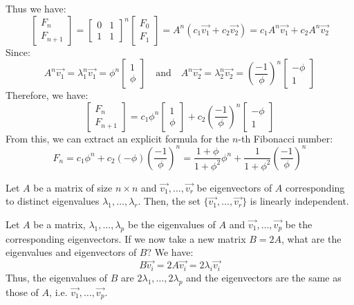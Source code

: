 \begin{eg}
\[    \]
    Thus we have:
    \[
        \begin{bmatrix}
            F_n \\ F_{n+1}
        \end{bmatrix} = \begin{bmatrix}
            0 & 1 \\ 1 & 1
        \end{bmatrix}^n \begin{bmatrix}
            F_0 \\ F_1
        \end{bmatrix} = A^n (c_1 \vec{v_1} + c_2 \vec{v_2}) = c_1 A^n \vec{v_1} + c_2 A^n \vec{v_2}
    \]
    Since:
    \[
        A^n \vec{v_1} = \lambda_1^n \vec{v_1} = \phi^n \begin{bmatrix}
            1 \\ \phi
        \end{bmatrix} \quad \text{and} \quad A^n \vec{v_2} = \lambda_2^n \vec{v_2} = \left(\frac{-1}{\phi}\right)^n \begin{bmatrix}
            -\phi \\ 1
        \end{bmatrix}
    \]
    Therefore, we have:
    \[        \begin{bmatrix}
            F_n \\ F_{n+1}
        \end{bmatrix} = c_1 \phi^n \begin{bmatrix}
            1 \\ \phi
        \end{bmatrix} + c_2 \left(\frac{-1}{\phi}\right)^n \begin{bmatrix}
            -\phi \\ 1
        \end{bmatrix}\]
    From this, we can extract an explicit formula for the $n$-th Fibonacci number:
    \[
        F_n = c_1 \phi^n + c_2 (-\phi) \left(\frac{-1}{\phi}\right)^n = \frac{1 + \phi}{1 + \phi^2} \phi^n + \frac{1}{1 + \phi^2} \left(\frac{-1}{\phi}\right)^n
    \]
\end{eg}

\begin{theorem}
    Let $A$ be a matrix of size $n \times n$ and $\vec{v_1}, \ldots, \vec{v_r}$ be eigenvectors of $A$ corresponding to distinct eigenvalues $\lambda_1, \ldots, \lambda_r$. Then, the set $\{\vec{v_1}, \ldots, \vec{v_r}\}$ is linearly independent.
\end{theorem}

\begin{eg}
    Let $A$ be a matrix, $\lambda_1, \ldots, \lambda_p$ be the eigenvalues of $A$ and $\vec{v_1}, \ldots, \vec{v_p}$ be the corresponding eigenvectors. If we now take a new matrix $B = 2A$, what are the eigenvalues and eigenvectors of $B$? We have:
    \[B \vec{v_i} = 2A \vec{v_i} = 2 \lambda_i \vec{v_i}\]
    Thus, the eigenvalues of $B$ are $2 \lambda_1, \ldots, 2 \lambda_p$ and the eigenvectors are the same as those of $A$, i.e. $\vec{v_1}, \ldots, \vec{v_p}$.
\end{eg}

